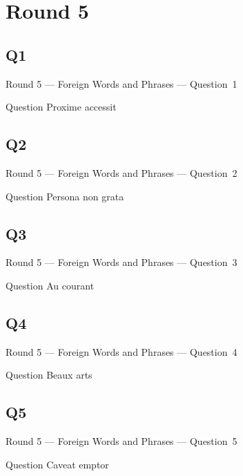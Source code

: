 \documentclass[11pt]{beamer}
\begin{document}
\section{Round 5}
\subsection*{Q1}
\begin{frame}[t]{Round 5 --- Foreign Words and Phrases --- \mbox{Question 1}}
    \vspace{-0.5em}
    \begin{block}{Question}
        Proxime accessit
    \end{block}
\end{frame}
\subsection*{Q2}
\begin{frame}[t]{Round 5 --- Foreign Words and Phrases --- \mbox{Question 2}}
    \vspace{-0.5em}
    \begin{block}{Question}
        Persona non grata
    \end{block}
\end{frame}
\subsection*{Q3}
\begin{frame}[t]{Round 5 --- Foreign Words and Phrases --- \mbox{Question 3}}
    \vspace{-0.5em}
    \begin{block}{Question}
        Au courant
    \end{block}
\end{frame}
\subsection*{Q4}
\begin{frame}[t]{Round 5 --- Foreign Words and Phrases --- \mbox{Question 4}}
    \vspace{-0.5em}
    \begin{block}{Question}
        Beaux arts
    \end{block}
\end{frame}
\subsection*{Q5}
\begin{frame}[t]{Round 5 --- Foreign Words and Phrases --- \mbox{Question 5}}
    \vspace{-0.5em}
    \begin{block}{Question}
        Caveat emptor
    \end{block}
\end{frame}
\end{document}
